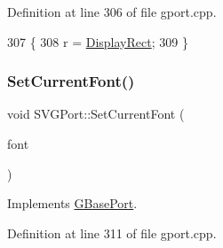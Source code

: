 Definition at line 306 of file gport.\+cpp.


\begin{DoxyCode}
307 \{
308     r = \mbox{\hyperlink{class_g_base_port_ac0e1180ebadeed5d3c7d0291db1bdf29}{DisplayRect}};
309 \}
\end{DoxyCode}
\mbox{\label{class_s_v_g_port_ac9b98b54d4b9b1e519d2741f5e8be837}} 
\subsubsection{\texorpdfstring{Set\+Current\+Font()}{SetCurrentFont()}}
{\footnotesize\ttfamily void S\+V\+G\+Port\+::\+Set\+Current\+Font (\begin{DoxyParamCaption}\item[{\mbox{\hyperlink{class_g_base_font}{G\+Base\+Font}} \&}]{font }\end{DoxyParamCaption})\hspace{0.3cm}{\ttfamily [virtual]}}



Implements \mbox{\hyperlink{class_g_base_port_af297609a9f7ed9d29d77072037888f5e}{G\+Base\+Port}}.



Definition at line 311 of file gport.\+cpp.


